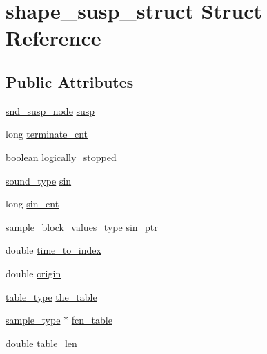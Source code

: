 \hypertarget{structshape__susp__struct}{}\section{shape\+\_\+susp\+\_\+struct Struct Reference}
\label{structshape__susp__struct}
\subsection*{Public Attributes}
\begin{DoxyCompactItemize}
\item 
\hyperlink{sound_8h_a6b268203688a934bd798ceb55f85d4c0}{snd\+\_\+susp\+\_\+node} \hyperlink{structshape__susp__struct_ab57aff7b90b07486dd0532b2bc5dce82}{susp}
\item 
long \hyperlink{structshape__susp__struct_a6137ae5fc7270ea3d91dff546b609e02}{terminate\+\_\+cnt}
\item 
\hyperlink{cext_8h_a7670a4e8a07d9ebb00411948b0bbf86d}{boolean} \hyperlink{structshape__susp__struct_a188b8e963460e3f4da70f16eb23e0ba4}{logically\+\_\+stopped}
\item 
\hyperlink{sound_8h_a792cec4ed9d6d636d342d9365ba265ea}{sound\+\_\+type} \hyperlink{structshape__susp__struct_ad565bc4145f7df57e5ffb45f86d71bdc}{sin}
\item 
long \hyperlink{structshape__susp__struct_ac06b6b21f0f142378fdb84559deae8f0}{sin\+\_\+cnt}
\item 
\hyperlink{sound_8h_a83d17f7b465d1591f27cd28fc5eb8a03}{sample\+\_\+block\+\_\+values\+\_\+type} \hyperlink{structshape__susp__struct_a01afbf2e27c587306c48f9b5a157b04d}{sin\+\_\+ptr}
\item 
double \hyperlink{structshape__susp__struct_a59b8a1c2f83042c0910c11f0716983cf}{time\+\_\+to\+\_\+index}
\item 
double \hyperlink{structshape__susp__struct_a9e350865103abe8137ac3d3d44d2f534}{origin}
\item 
\hyperlink{sound_8h_a187b856587310160cfd8b383e7377171}{table\+\_\+type} \hyperlink{structshape__susp__struct_a95960a4f8f9fe405db8a924bb0611465}{the\+\_\+table}
\item 
\hyperlink{sound_8h_a3a9d1d4a1c153390d2401a6e9f71b32c}{sample\+\_\+type} $\ast$ \hyperlink{structshape__susp__struct_a321f17c0b6f71298eacf0aefbbf99516}{fcn\+\_\+table}
\item 
double \hyperlink{structshape__susp__struct_a712056b16316039c349422df53d058d4}{table\+\_\+len}
\end{DoxyCompactItemize}


